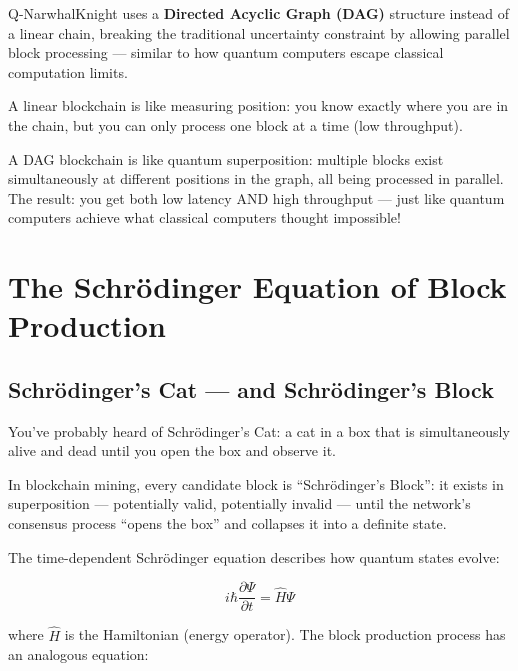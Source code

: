 \documentclass[11pt,a4paper]{article}
\begin{document}
Q-NarwhalKnight uses a \textbf{Directed Acyclic Graph (DAG)} structure instead of a linear chain, breaking the traditional uncertainty constraint by allowing parallel block processing --- similar to how quantum computers escape classical computation limits.

\begin{tcolorbox}[colback=funpurple!10,colframe=funpurple,title=\textbf{How DAG Breaks the Uncertainty Trade-off}]
A linear blockchain is like measuring position: you know exactly where you are in the chain, but you can only process one block at a time (low throughput).

A DAG blockchain is like quantum superposition: multiple blocks exist simultaneously at different positions in the graph, all being processed in parallel. The result: you get both low latency AND high throughput --- just like quantum computers achieve what classical computers thought impossible!
\end{tcolorbox}

\section{The Schr\"{o}dinger Equation of Block Production}

\subsection{Schr\"{o}dinger's Cat --- and Schr\"{o}dinger's Block}

You've probably heard of Schr\"{o}dinger's Cat: a cat in a box that is simultaneously alive and dead until you open the box and observe it.

In blockchain mining, every candidate block is ``Schr\"{o}dinger's Block'': it exists in superposition --- potentially valid, potentially invalid --- until the network's consensus process ``opens the box'' and collapses it into a definite state.

The time-dependent Schr\"{o}dinger equation describes how quantum states evolve:

\begin{equation}
i\hbar \frac{\partial \Psi}{\partial t} = \hat{H}\Psi
\end{equation}

where $\hat{H}$ is the Hamiltonian (energy operator). The block production process has an analogous equation:
\end{document}
